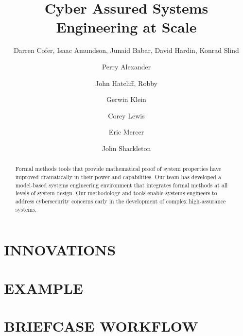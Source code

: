 \documentclass{IEEEcsmag}
\begin{document}

\title{Cyber Assured Systems Engineering at Scale}

\author{Darren Cofer, Isaac Amundson, Junaid Babar, David Hardin, Konrad Slind}

\author{Perry Alexander}

\author{John Hatcliff, Robby}

\author{Gerwin Klein}

\author{Corey Lewis}

\author{Eric Mercer}

\author{John Shackleton}


\begin{abstract}
Formal methods tools that provide mathematical proof of system properties
have improved dramatically in their power and capabilities. Our team has developed a model-based systems
engineering environment that integrates formal methods at all levels of system design.
Our methodology and tools enable systems engineers to address
cybersecurity concerns early in the development of complex high-assurance systems.
\end{abstract}

\maketitle




\section{INNOVATIONS}


\section{EXAMPLE}


\section{BRIEFCASE WORKFLOW}

\end{document}
